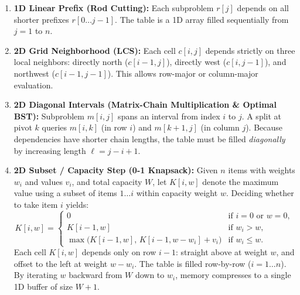 \begin{enumerate}
  \item \textbf{1D Linear Prefix (Rod Cutting):} Each subproblem $r[j]$ depends on all shorter prefixes $r[0 \dots j-1]$. The table is a 1D array filled sequentially from $j = 1$ to $n$.
  \item \textbf{2D Grid Neighborhood (LCS):} Each cell $c[i, j]$ depends strictly on three local neighbors: directly north ($c[i-1, j]$), directly west ($c[i, j-1]$), and northwest ($c[i-1, j-1]$). This allows row-major or column-major evaluation.
  \item \textbf{2D Diagonal Intervals (Matrix-Chain Multiplication \& Optimal BST):} Subproblem $m[i, j]$ spans an interval from index $i$ to $j$. A split at pivot $k$ queries $m[i, k]$ (in row $i$) and $m[k+1, j]$ (in column $j$). Because dependencies have shorter chain lengths, the table must be filled \emph{diagonally} by increasing length $\ell = j - i + 1$.
  \item \textbf{2D Subset / Capacity Step (0-1 Knapsack):} Given $n$ items with weights $w_i$ and values $v_i$, and total capacity $W$, let $K[i, w]$ denote the maximum value using a subset of items $1 \dots i$ within capacity weight $w$. Deciding whether to take item $i$ yields:
  \[
    K[i, w] = \begin{cases}
      0 & \text{if } i = 0 \text{ or } w = 0, \\
      K[i-1, w] & \text{if } w_i > w, \\
      \max\big(K[i-1, w],\, K[i-1, w - w_i] + v_i\big) & \text{if } w_i \le w.
    \end{cases}
  \]
  Each cell $K[i, w]$ depends only on row $i-1$: straight above at weight $w$, and offset to the left at weight $w - w_i$. The table is filled row-by-row ($i = 1 \dots n$). By iterating $w$ backward from $W$ down to $w_i$, memory compresses to a single 1D buffer of size $W+1$.
\end{enumerate}


